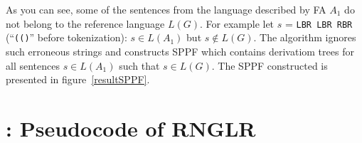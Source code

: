 
As you can see, some of the sentences from the language described by FA $A_1$ do not belong to the reference language $L(G)$.
For example let $s$ = \verb|LBR LBR RBR| (``\verb|(()|'' before tokenization): $s \in L(A_1)$ but $s \notin L(G)$.
The algorithm ignores such erroneous strings and constructs SPPF which contains derivatiom trees for all sentences $s \in L(A_1)$ such that $s \in L(G)$.
The SPPF constructed is presented in figure~\ref{resultSPPF}.


\section{\appendixname: Pseudocode of RNGLR}\label{RNGLRCode}


